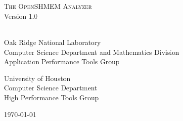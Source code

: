 \begin{titlepage}
  \begin{center}

    \vspace{1.0in} ~ \\

    \HRule \\[0.1in]
    {\LARGE \textsc{The OpenSHMEM Analyzer}} \\
    \vspace{0.2in}
    {\LARGE Version 1.0} \\
    \HRule \\[0.5in]

    \vspace{1.0in}

    Oak Ridge National Laboratory \\
    Computer Science Department and Mathematics Division \\
    Application Performance Tools Group \\

    \vspace{0.4in}

    University of Houston \\
    Computer Science Department \\
    High Performance Tools Group

    \vspace{1.0in}

    \today

  \end{center}
\end{titlepage}

